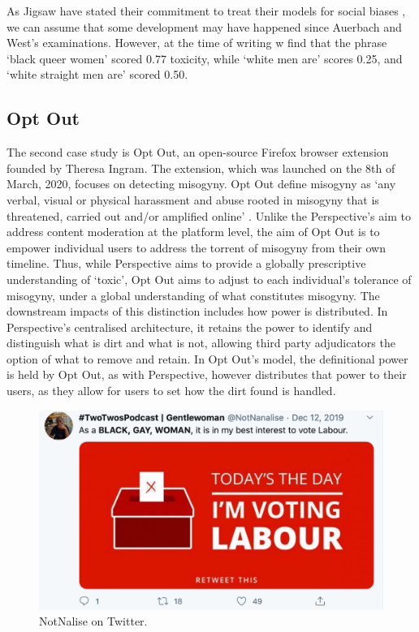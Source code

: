 As Jigsaw have stated their commitment to treat their models for social biases \cite{Marvin:2019}, we can assume that some development may have happened since Auerbach and West's examinations. 
However, at the time of writing w find that the phrase ‘black queer women’ scored 0.77 toxicity, while ‘white men are’ scores 0.25, and ‘white straight men are’ scored 0.50.

\subsection{Opt Out}\label{sub:optout}
The second case study is Opt Out, an open-source Firefox browser extension founded by Theresa Ingram. 
The extension, which was launched on the 8th of March, 2020, focuses on detecting misogyny. 
Opt Out define misogyny as `any verbal, visual or physical harassment and abuse rooted in misogyny that is threatened, carried out and/or amplified online' \cite{Ingram:2020}. 
Unlike the Perspective's aim to address content moderation at the platform level, the aim of Opt Out is to empower individual users to address the torrent of misogyny from their own timeline. 
Thus, while Perspective aims to provide a globally prescriptive understanding of `toxic', Opt Out aims to adjust to each individual's tolerance of misogyny, under a global understanding of what constitutes misogyny. 
The downstream impacts of this distinction includes how power is distributed. 
In Perspective's centralised architecture, it retains the power to identify and distinguish what is dirt and what is not, allowing third party adjudicators the option of what to remove and retain. 
In Opt Out's model, the definitional power is held by Opt Out, as with Perspective, however distributes that power to their users, as they allow for users to set how the dirt found is handled.

\begin{figure}[!ht]
  \centering
  \includegraphics[scale=0.5]{Notnalise.png}
  \caption{NotNalise on Twitter.}
  \label{fig:notnalise}
\end{figure}


